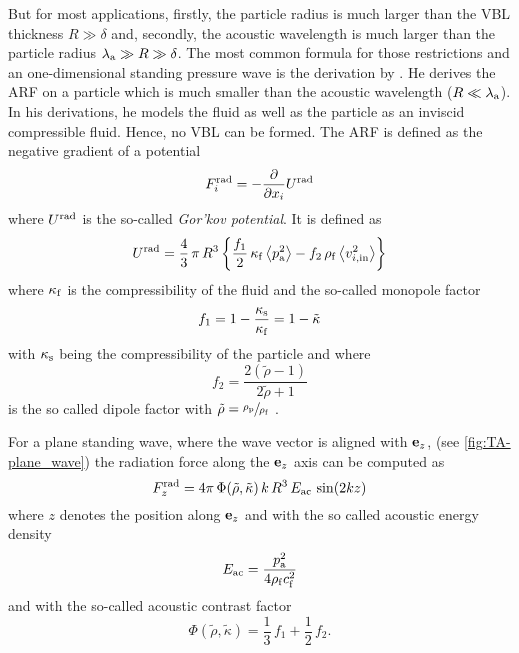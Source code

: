 But for most applications, firstly, the particle radius is much larger than the 
VBL thickness $R \gg \delta$ and, secondly, the acoustic wavelength is much 
larger than the particle radius $\lambda_{\mathrm{a}}\gg R \gg \delta$. The 
most common formula for those restrictions and an one-dimensional standing 
pressure wave is the derivation by . He derives the ARF on a 
particle which is much smaller than the acoustic wavelength 
($R\ll\lambda_{\mathrm{a}}$). In his derivations, he models the fluid as well as 
the particle as an inviscid compressible fluid. Hence, no VBL can be formed. 
The ARF is defined as the negative gradient of a potential
\begin{equation}
  F^{\mathrm{rad}}_{i} = -\pdv{x_{i}}U^{\mathrm{rad}}
  \label{eq:TA-gorkov}
\end{equation}
where $U^{\mathrm{rad}}$ is the so-called \emph{Gor'kov potential}. It is defined 
as
\begin{equation}
  U^{\mathrm{rad}} = \frac{4}{3}\,\pi\,R^{3}\left\{ 
  \frac{f_{1}}{2}\,\kappa_{\mathrm{f}}\left\langle p^{2}_{\mathrm{a}} \right\rangle - 
f_{2}\,\rho_{\mathrm{f}}\left\langle v^{2}_{i,\mathrm{in}} \right\rangle \right\}
    \label{eq:TA-gorkov-potential}
\end{equation}
where $\kappa_{\mathrm{f}}$ is the compressibility of the fluid and the so-called 
monopole factor
\begin{equation}
  f_{1} = 1 - \frac{\kappa_{\mathrm{s}}}{\kappa_{\mathrm{f}}} = 1 - \tilde{\kappa}
  \label{eq:TA-fone}
\end{equation}
with $\kappa_{\mathrm{s}}$ being the compressibility of the particle and where
\begin{equation}
f_{2} = \frac{2(\tilde{\rho}-1)}{2\tilde{\rho}+1}
\label{eq:TA-ftwo}
\end{equation}
is the so called dipole factor with $\tilde{\rho} = \sfrac{\rho_{\mathrm{p}}}{\rho_{\mathrm{f}}}$ 
\cite{Gorkov1962,Bruus2012}.


For a plane standing wave, where the wave vector is aligned with $\vb{e}_{z}$, (see 
\cref{fig:TA-plane_wave}) the radiation force along the $\vb{e}_{z}$ axis can be 
computed as~\cite{Bruus2012}
\begin{equation}
  F_{z}^{\mathrm{rad}} = 
  4\pi\,\Phi(\tilde{\rho},\tilde{\kappa})\,k\,R^{3}\,E_{\mathrm{ac}}\,\sin(2kz)
  \label{eq:TA-ARFy}
\end{equation}
where $z$ denotes the position along $\vb{e}_{z}$ and with the so called acoustic 
energy density
\begin{equation}
  E_{\mathrm{ac}} = \frac{p_{\mathrm{a}}^{2}}{4\rho_{\mathrm{f}}c_{\mathrm{f}}^{2}}
  \label{eq:TA-Eac}
\end{equation}
and with the so-called acoustic contrast factor
\begin{equation}
  \Phi(\tilde{\rho},\tilde{\kappa}) = \frac{1}{3}\,f_{1} + \frac{1}{2}\,f_{2}.
  \label{eq:TA-Phi}
\end{equation}

